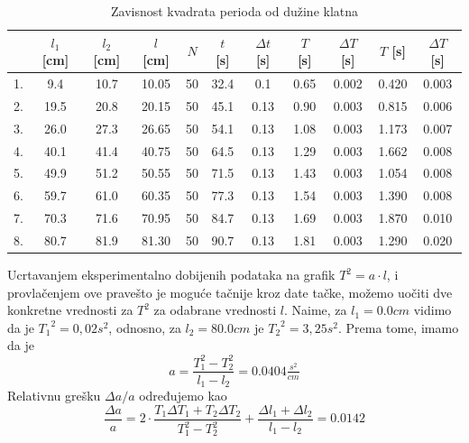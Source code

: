 \begin{table}[h!]
    \centering
    \begin{tabular}{|c|c|c|c|c|c|c|c|c|c|c|}
      \hline
         & $l_1$ [cm] & $l_2$ [cm] & $l$ [cm] & $N$ & $t$ [s] & $\Delta t$ [s] & $T$ [s] & $\Delta T$ [s] & $T$ [s] & $\Delta T$ [s] \\ \hline
      1. & 9.4        & 10.7       & 10.05    & 50 & 32.4     & 0.1            & 0.65    & 0.002 & 0.420  & 0.003 \\ \hline
      2. & 19.5       & 20.8       & 20.15    & 50 & 45.1     & 0.13           & 0.90    & 0.003 & 0.815  & 0.006 \\ \hline
      3. & 26.0       & 27.3       & 26.65    & 50 & 54.1     & 0.13           & 1.08    & 0.003 & 1.173  & 0.007 \\ \hline
      4. & 40.1       & 41.4       & 40.75    & 50 & 64.5     & 0.13           & 1.29    & 0.003 & 1.662  & 0.008 \\ \hline
      5. & 49.9       & 51.2       & 50.55    & 50 & 71.5     & 0.13           & 1.43    & 0.003 & 1.054  & 0.008 \\ \hline
      6. & 59.7       & 61.0       & 60.35    & 50 & 77.3     & 0.13           & 1.54    & 0.003 & 1.390  & 0.008 \\ \hline
      7. & 70.3       & 71.6       & 70.95    & 50 & 84.7     & 0.13           & 1.69    & 0.003 & 1.870  & 0.010 \\ \hline
      8. & 80.7       & 81.9       & 81.30    & 50 & 90.7     & 0.13           & 1.81    & 0.003 & 1.290  & 0.020 \\ \hline
    \end{tabular}
    \label{tab:rezulatati}
    \caption{Zavisnost kvadrata perioda od dužine klatna}
\end{table}

Ucrtavanjem eksperimentalno dobijenih podataka na grafik $T^2 = a \cdot l$, i provlačenjem ove pravešto je moguće tačnije kroz date tačke, možemo uočiti dve konkretne vrednosti za $T^2$ za odabrane vrednosti $l$. Naime, za $l_1 = 0.0 cm$ vidimo da je ${T_1}^2 = 0,02s^2$, odnosno, za $l_2 = 80.0 cm$ je ${T_2}^2 = 3,25s^2$. Prema tome, imamo da je
\begin{equation}
    a = \frac{T_1^2 - T_2^2}{l_1 - l_2} = 0.0404 \tfrac{s^2}{cm}
\end{equation}
Relativnu grešku $\Delta a / a$ određujemo kao
\begin{equation}
    \frac{\Delta a}{a} = 2 \cdot \frac{T_1 \Delta T_1 + T_2 \Delta T_2}{T_1^2 - T_2^2} + \frac{\Delta l_1 + \Delta l_2}{l_1 - l_2} = 0.0142
\end{equation}

